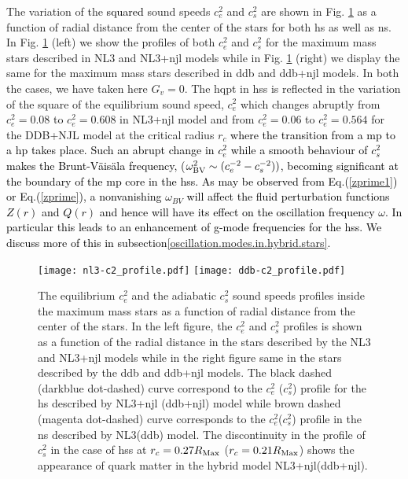 \documentclass[a4paper, 11pt]{article}
\newcommand{\magenta}[1]{\textcolor{black}{#1}}
\begin{document}
The variation  of the \magenta{squared } sound speeds $c_e^2$ and $c_s^2$ are shown in Fig. \ref{figure:cs2_ce2_profile} 
as a function of radial distance from the center of the stars for both \ac{hs} as well as \ac{ns}. In
 Fig. \ref{figure:cs2_ce2_profile} (left) we show the profiles of both $c_e^2$ and $c_s^2$ for the maximum mass stars 
described in NL3 and NL3+\ac{njl} models while in Fig. \ref{figure:cs2_ce2_profile} (right) we display the
 same for the maximum mass stars described in \ac{ddb} and \ac{ddb}+\ac{njl} models.
 In both the cases, we have taken here $G_v=0$. The \ac{hqpt} in \ac{hs}s is 
reflected in the variation of the square of the equilibrium sound speed, $c_e^2$ which changes abruptly 
from $c_e^2=0.08$ to $c_e^2=0.608$ in NL3+\ac{njl} model and from $c_e^2=0.06$ to $c_e^2=0.564$ 
for the DDB+NJL model at the critical radius $r_c$ \magenta{where the transition from a \ac{mp} to a \ac{hp}
takes place. Such an abrupt change in $c_e^2$ while a smooth behaviour of $c_s^2$ makes the 
 Brunt-V\"{a}is\"{a}la frequency, ($\omega_{\rm BV}^2\sim (c_e^{-2}-c_s^{-2}))$, becoming significant
at the boundary of the \ac{mp} core in the \ac{hs}s. As may be observed from Eq.(\ref{zprime1}) or Eq.(\ref{zprime}),
a nonvanishing $\omega_{BV}$ will affect the fluid perturbation functions $Z(r)$ and $Q(r)$ and hence will have its effect on the
oscillation frequency $\omega$. In particular this leads to an enhancement of g-mode frequencies for the \ac{hs}s.
We discuss more of this in subsection\ref{oscillation.modes.in.hybrid.stars}.}

\begin{figure}
\centering
\texttt{[image: nl3-c2\_profile.pdf]}
\texttt{[image: ddb-c2\_profile.pdf]}
\caption{The equilibrium $c_e^2$ and the adiabatic $c_s^2$ sound speeds profiles inside the maximum mass stars as a function of radial distance from the center of the stars. In the left figure, the $c_e^2$ and $c_s^2$ profiles is shown as a function of the radial distance in the stars described by the NL3 and NL3+\ac{njl} models while in the right figure same in the stars described by the \ac{ddb} and \ac{ddb}+\ac{njl} models. The black dashed (darkblue dot-dashed) curve correspond to the $c_e^2$ ($c_s^2$) profile for the \ac{hs} described by NL3+\ac{njl} (\ac{ddb}+\ac{njl}) model while brown dashed (magenta dot-dashed) curve corresponds to the $c_e^2$($c_s^2$) profile in the \ac{ns} described by NL3(\ac{ddb}) model. The discontinuity in the profile of $c_s^2$ in the case of \ac{hs}s at $r_c=0.27 R_{\rm Max}$ ($r_c=0.21 R_{\rm Max}$) shows the appearance of quark matter in the hybrid model NL3+\ac{njl}(\ac{ddb}+\ac{njl}).}
\label{figure:cs2_ce2_profile}
\end{figure}
\end{document}
